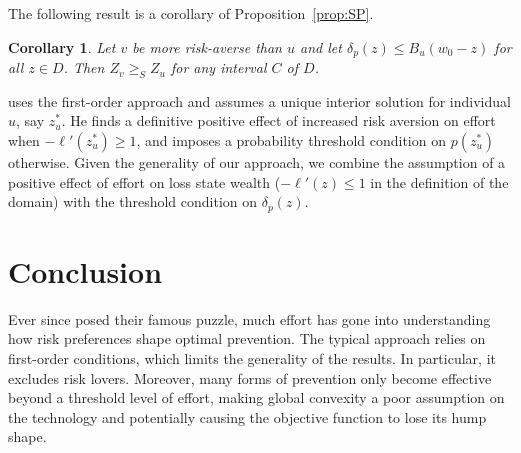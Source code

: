 \documentclass[11pt]{article}
\newtheorem{corollary}[theorem]{Corollary}
\begin{document}
The following result is a corollary of Proposition~\ref{prop:SP}.

\begin{corollary}\label{cor:SICP}
	Let $v$ be more risk-averse than $u$ and let $\delta_p(z) \leq B_u(w_0-z)$ for all $z \in D$. Then $Z_v \geq_S Z_u$ for any interval $C$ of $D$.
\end{corollary}

\cite{lee1998risk} uses the first-order approach and assumes a unique interior solution for individual $u$, say $z^*_u$. He finds a definitive positive effect of increased risk aversion on effort when $-\ell'(z^*_u) \geq 1$, and imposes a probability threshold condition on $p(z^*_u)$ otherwise. Given the generality of our approach, we combine the assumption of a positive effect of effort on loss state wealth ($-\ell'(z) \leq 1$ in the definition of the domain) with the threshold condition on $\delta_p(z)$.


\section{Conclusion}

Ever since \cite{dionne1985self} posed their famous puzzle, much effort has gone into understanding how risk preferences shape optimal prevention. The typical approach relies on first-order conditions, which limits the generality of the results. In particular, it excludes risk lovers. Moreover, many forms of prevention only become effective beyond a threshold level of effort, making global convexity a poor assumption on the technology and potentially causing the objective function to lose its hump shape.
\end{document}
